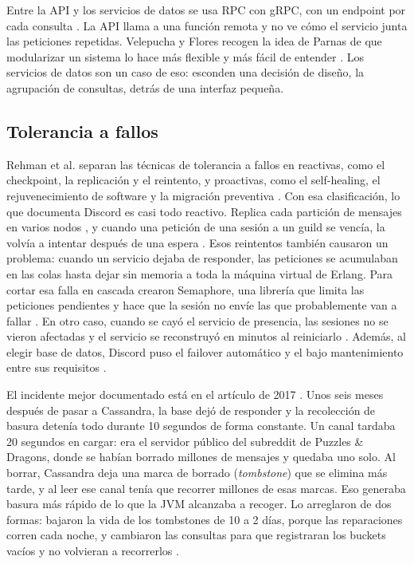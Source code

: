\documentclass[11pt,a4paper]{article}
\begin{document}
Entre la API y los servicios de datos se usa RPC con gRPC, con un endpoint por cada consulta \cite{Ingram2023}. La API llama a una función remota y no ve cómo el servicio junta las peticiones repetidas. Velepucha y Flores recogen la idea de Parnas de que modularizar un sistema lo hace más flexible y más fácil de entender \cite{Velepucha2023}. Los servicios de datos son un caso de eso: esconden una decisión de diseño, la agrupación de consultas, detrás de una interfaz pequeña.

\subsection{Tolerancia a fallos}\label{sec:fallos}

Rehman et al. separan las técnicas de tolerancia a fallos en reactivas, como el checkpoint, la replicación y el reintento, y proactivas, como el self-healing, el rejuvenecimiento de software y la migración preventiva \cite{Rehman2022}. Con esa clasificación, lo que documenta Discord es casi todo reactivo. Replica cada partición de mensajes en varios nodos \cite{Ingram2023}, y cuando una petición de una sesión a un guild se vencía, la volvía a intentar después de una espera \cite{Vishnevskiy2017elixir}. Esos reintentos también causaron un problema: cuando un servicio dejaba de responder, las peticiones se acumulaban en las colas hasta dejar sin memoria a toda la máquina virtual de Erlang. Para cortar esa falla en cascada crearon Semaphore, una librería que limita las peticiones pendientes y hace que la sesión no envíe las que probablemente van a fallar \cite{Vishnevskiy2017elixir}. En otro caso, cuando se cayó el servicio de presencia, las sesiones no se vieron afectadas y el servicio se reconstruyó en minutos al reiniciarlo \cite{Vishnevskiy2017elixir}. Además, al elegir base de datos, Discord puso el failover automático y el bajo mantenimiento entre sus requisitos \cite{Vishnevskiy2017billions}.

El incidente mejor documentado está en el artículo de 2017 \cite{Vishnevskiy2017billions}. Unos seis meses después de pasar a Cassandra, la base dejó de responder y la recolección de basura detenía todo durante 10 segundos de forma constante. Un canal tardaba 20 segundos en cargar: era el servidor público del subreddit de Puzzles \& Dragons, donde se habían borrado millones de mensajes y quedaba uno solo. Al borrar, Cassandra deja una marca de borrado (\emph{tombstone}) que se elimina más tarde, y al leer ese canal tenía que recorrer millones de esas marcas. Eso generaba basura más rápido de lo que la JVM alcanzaba a recoger. Lo arreglaron de dos formas: bajaron la vida de los tombstones de 10 a 2 días, porque las reparaciones corren cada noche, y cambiaron las consultas para que registraran los buckets vacíos y no volvieran a recorrerlos \cite{Vishnevskiy2017billions}.
\end{document}
